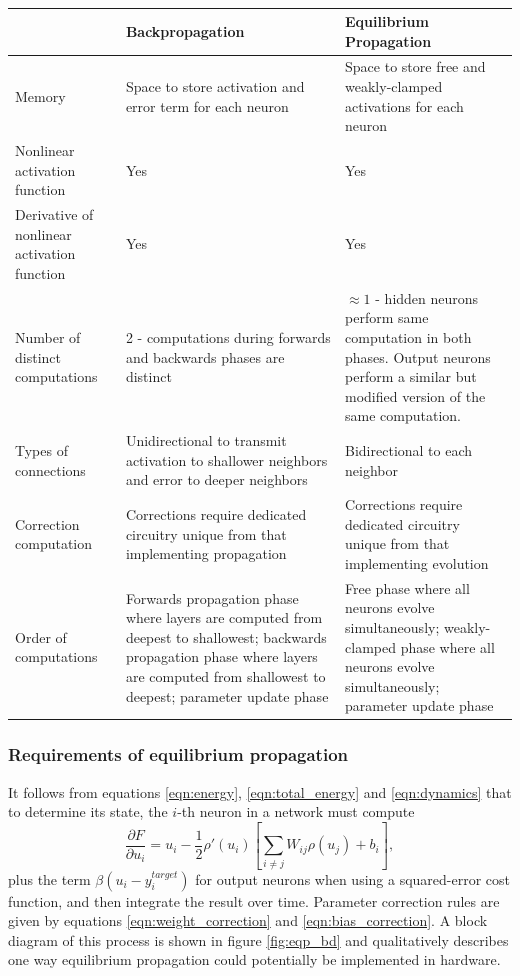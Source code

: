 \documentclass[utf8]{frontiersSCNS}
\begin{document}
\begin{table}
\begin{center}
\begin{tabular}{|L||L|L|}
\hline 
&Backpropagation & Equilibrium Propagation \\ \hline\hline
Memory & Space to store activation and error term for each neuron & Space to store free and weakly-clamped activations for each neuron \\ \hline
Nonlinear activation function & Yes & Yes \\ \hline
Derivative of nonlinear activation function & Yes & Yes \\ \hline
Number of distinct computations & 2 - computations during forwards and backwards phases are distinct & $\approx 1$ - hidden neurons perform same computation in both phases. Output neurons perform a similar but modified version of the same computation. \\ \hline
Types of connections & Unidirectional to transmit activation to shallower neighbors and error to deeper neighbors & Bidirectional to each neighbor \\ \hline
Correction computation & Corrections require dedicated circuitry unique from that implementing propagation & Corrections require dedicated circuitry unique from that implementing evolution \\ \hline
Order of computations & Forwards propagation phase where layers are computed from deepest to shallowest; backwards propagation phase where layers are computed from shallowest to deepest; parameter update phase & Free phase where all neurons evolve simultaneously; weakly-clamped phase where all neurons evolve simultaneously; parameter update phase \\ \hline
\end{tabular}
\caption{}
\label{table:bp_eqp_contrast}
\end{center}
\end{table}

\subsubsection{Requirements of equilibrium propagation}

It follows from equations \ref{eqn:energy}, \ref{eqn:total_energy} and \ref{eqn:dynamics} that to determine its state, the $i$-th neuron in a network must compute $$\frac{\partial F}{\partial u_i}=u_i-\frac{1}{2}\rho'(u_i)[\sum_{i\neq j}W_{ij}\rho(u_j)+b_i],$$ plus the term $\beta(u_i-y_i^{target})$ for output neurons when using a squared-error cost function, and then integrate the result over time. Parameter correction rules are given by equations \ref{eqn:weight_correction} and \ref{eqn:bias_correction}. A block diagram of this process is shown in figure \ref{fig:eqp_bd} and qualitatively describes one way equilibrium propagation could potentially be implemented in hardware.
\end{document}
